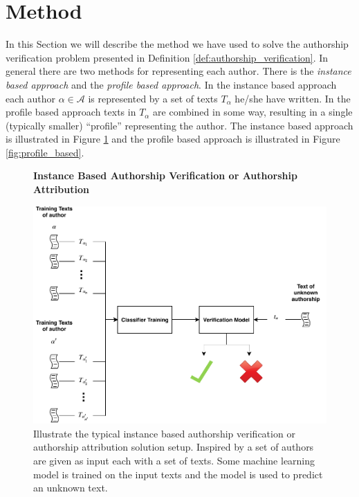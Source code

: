 \section{Method} \label{sec:method}

In this Section we will describe the method we have used to solve the authorship
verification problem presented in Definition \ref{def:authorship_verification}.
In general there are two methods for representing each author. There is the
\textit{instance based approach} and the \textit{profile based approach}. In
the instance based approach each author $\alpha \in \mathcal{A}$ is represented
by a set of texts $T_\alpha$ he/she have written. In the profile based approach
texts in $T_\alpha$ are combined in some way, resulting in a single (typically
smaller) ``profile'' representing the author. The instance based approach is
illustrated in Figure \ref{fig:instance_based} and the profile based approach is
illustrated in Figure \ref{fig:profile_based}.

\begin{figure}[htb]
    \centering
    \textbf{Instance Based Authorship Verification or Authorship Attribution}\par\medskip
    \includegraphics[scale=0.5]{./pictures/method/instance_based}
    \caption{Illustrate the typical instance based authorship verification or
        authorship attribution solution setup. Inspired by \citet{stamatos2009}
        a set of authors are given as input each with a set of texts. Some
        machine learning model is trained on the input texts and the model is
        used to predict an unknown text.}
    \label{fig:instance_based}
\end{figure}

